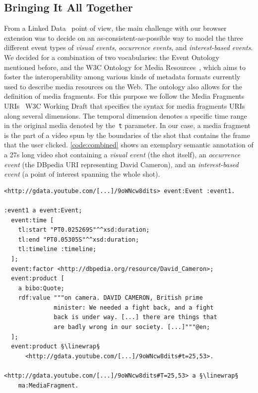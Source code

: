 \documentclass[runningheads,a4paper]{llncs}
\newcommand{\linewrap}{\raisebox{-.6ex}{\textcolor{grey}{$\hookleftarrow$}}}
\begin{document}
\subsection{Bringing It All Together}
From a Linked Data~\cite{Hausenblas:LDOW09} point of view, the main challenge with our browser extension was to decide on an as-consistent-as-possible way to model the three different event types of \emph{visual events}, \emph{occurrence events}, and \emph{interest-based events}. We decided for a combination of two vocabularies: the Event Ontology~\cite{Raimond:Event} mentioned before, and the W3C Ontology for Media Resources~\cite{mediaontology}, which aims to foster the interoperability among various kinds of metadata formats currently used to describe media resources on the Web. The ontology also allows for the definition of media fragments. For this purpose we follow the Media Fragments URIs~\cite{W3C:MediaFrags} W3C Working Draft that specifies the syntax for media fragments URIs along several dimensions. The temporal dimension denotes a specific time range in the original media denoted by the~\texttt{t} parameter. In our case, a media fragment is the part of a video spun by the boundaries of the shot that contains the frame that the user clicked. \autoref{code:combined} shows an exemplary semantic annotation of a 27s long video shot containing a \emph{visual event} (the shot itself), an \emph{occurrence event} (the DBpedia URI representing David Cameron), and an \emph{interest-based event} (a point of interest spanning the whole shot). 

\begin{lstlisting}[caption=Semantic annotation of a 27s long video shot (\emph{visual event}) showing David Cameron (\emph{occurrence event}) talk about the London riots. The shot is also a point of interest generated by a click of a YouTube user (\emph{interest-based event})., label=code:combined, float=h, escapechar=§]
<http://gdata.youtube.com/[...]/9oWNcw8dits> event:Event :event1.

:event1 a event:Event;
  event:time [
    tl:start "PT0.025269S"^^xsd:duration;
    tl:end "PT0.05305S"^^xsd:duration;
    tl:timeline :timeline;
  ];
  event:factor <http://dbpedia.org/resource/David_Cameron>;
  event:product [
    a bibo:Quote;
    rdf:value """on camera. DAVID CAMERON, British prime
              minister: We needed a fight back, and a fight
              back is under way. [...] there are things that
              are badly wrong in our society. [...]"""@en;
  ];
  event:product §\linewrap§
      <http://gdata.youtube.com/[...]/9oWNcw8dits#t=25,53>.
      
<http://gdata.youtube.com/[...]/9oWNcw8dits#T=25,53> a §\linewrap§
    ma:MediaFragment.
\end{lstlisting} 
\end{document}
